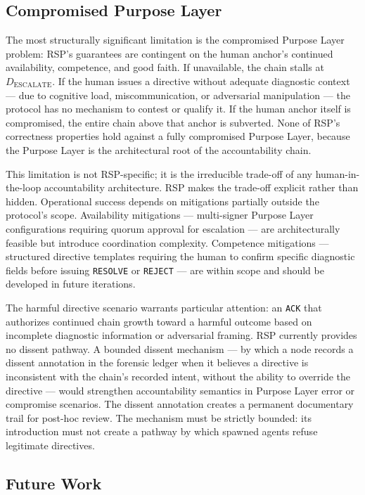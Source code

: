 \subsection{Compromised Purpose Layer}
\label{sec:rs-purpose-compromise}

The most structurally significant limitation is the compromised Purpose Layer problem: RSP's guarantees are contingent on the human anchor's continued availability, competence, and good faith. If unavailable, the chain stalls at $D_{\text{ESCALATE}}$. If the human issues a directive without adequate diagnostic context --- due to cognitive load, miscommunication, or adversarial manipulation --- the protocol has no mechanism to contest or qualify it. If the human anchor itself is compromised, the entire chain above that anchor is subverted. None of RSP's correctness properties hold against a fully compromised Purpose Layer, because the Purpose Layer is the architectural root of the accountability chain.

This limitation is not RSP-specific; it is the irreducible trade-off of any human-in-the-loop accountability architecture. RSP makes the trade-off explicit rather than hidden. Operational success depends on mitigations partially outside the protocol's scope. Availability mitigations --- multi-signer Purpose Layer configurations requiring quorum approval for escalation --- are architecturally feasible but introduce coordination complexity. Competence mitigations --- structured directive templates requiring the human to confirm specific diagnostic fields before issuing \texttt{RESOLVE} or \texttt{REJECT} --- are within scope and should be developed in future iterations.

The harmful directive scenario warrants particular attention: an \texttt{ACK} that authorizes continued chain growth toward a harmful outcome based on incomplete diagnostic information or adversarial framing. RSP currently provides no dissent pathway. A bounded dissent mechanism --- by which a node records a dissent annotation in the forensic ledger when it believes a directive is inconsistent with the chain's recorded intent, without the ability to override the directive --- would strengthen accountability semantics in Purpose Layer error or compromise scenarios. The dissent annotation creates a permanent documentary trail for post-hoc review. The mechanism must be strictly bounded: its introduction must not create a pathway by which spawned agents refuse legitimate directives.

\subsection{Future Work}
\label{sec:rs-future-work}

